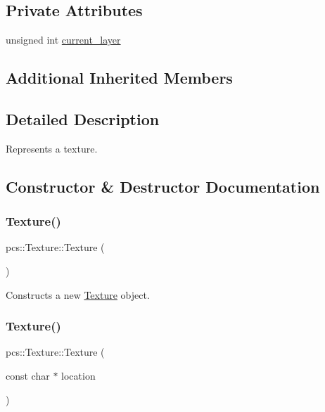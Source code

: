 \subsection*{Private Attributes}
\begin{DoxyCompactItemize}
\item 
unsigned int \hyperlink{classpcs_1_1Texture_a6308be3376398be4188f5bbed20c5a90}{current\+\_\+layer}
\end{DoxyCompactItemize}
\subsection*{Additional Inherited Members}


\subsection{Detailed Description}
Represents a texture. 

\subsection{Constructor \& Destructor Documentation}
\mbox{\label{classpcs_1_1Texture_a1f0e7c4ed23cf395b082cc5cc56497a4}} 
\subsubsection{\texorpdfstring{Texture()}{Texture()}\hspace{0.1cm}{\footnotesize\ttfamily [1/2]}}
{\footnotesize\ttfamily pcs\+::\+Texture\+::\+Texture (\begin{DoxyParamCaption}{ }\end{DoxyParamCaption})}



Constructs a new \hyperlink{classpcs_1_1Texture}{Texture} object. 

\mbox{\label{classpcs_1_1Texture_a7d85ec721e688ee7313bd858477fbcf2}} 
\subsubsection{\texorpdfstring{Texture()}{Texture()}\hspace{0.1cm}{\footnotesize\ttfamily [2/2]}}
{\footnotesize\ttfamily pcs\+::\+Texture\+::\+Texture (\begin{DoxyParamCaption}\item[{const char $\ast$}]{location }\end{DoxyParamCaption})}



